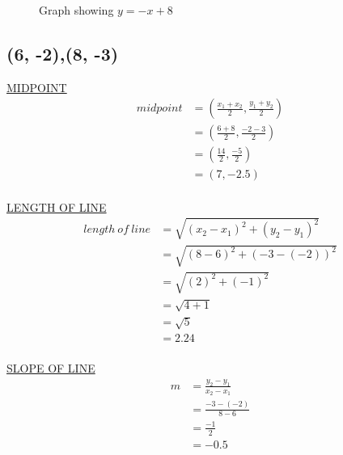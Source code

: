 \documentclass{article}
\begin{document}
\begin{description}
\begin{figure}[H]
\begin{center}
                \caption{\label{Graph-1}Graph showing $y=-x+8$}
            \end{center}
        \end{figure}
        \clearpage
        \subsection{(6, -2),(8, -3)}
        \underline{MIDPOINT}
        $$
            \begin{aligned}
                midpoint & = (\frac{x_1+x_2}{2}, \frac{y_1+y_2}{2}) \\
                         & = (\frac{6+8}{2}, \frac{-2-3}{2})        \\
                         & = (\frac{14}{2}, \frac{-5}{2})           \\
                         & = (7, -2.5)                              \\
            \end{aligned}
        $$

        \underline{LENGTH OF LINE}
        $$
            \begin{aligned}
                length \ of \ line & = \sqrt{(x_2-x_1)^2 + (y_2-y_1)^2} \\
                                   & = \sqrt{(8-6)^2 + (-3-(-2))^2}     \\
                                   & = \sqrt{(2)^2 + (-1)^2}            \\
                                   & = \sqrt{4 + 1}                     \\
                                   & = \sqrt{5}                         \\
                                   & = 2.24                             \\
            \end{aligned}
        $$

        \underline{SLOPE OF LINE}
        $$
            \begin{aligned}
                m & = \frac{y_2-y_1}{x_2-x_1} \\
                  & = \frac{-3-(-2)}{8-6}     \\
                  & = \frac{-1}{2}            \\
                  & = -0.5                    \\
            \end{aligned}
        $$


\end{description}
\end{document}
